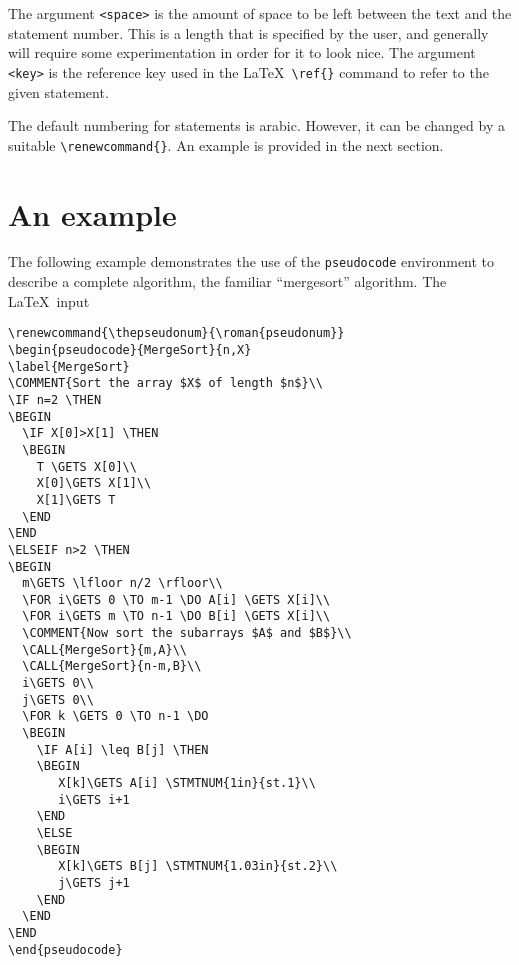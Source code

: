 \documentclass{article}
\newcommand{\keyword}[1]{\texttt{#1}}
\begin{document}
\noindent{}The argument \verb+<space>+ is the amount of space to be left between
the text and the statement number.  This is a length that is specified by the
user, and generally will require some experimentation in order for it to look nice.
The argument \verb+<key>+ is the reference key
used in the LaTeX\  \verb+\ref{}+ command to refer to the given
statement.

The default numbering for statements is arabic. However, it can be changed
by a suitable \verb+\renewcommand{}+.
An example is provided in the next section.

\section{An example}

The following example demonstrates the use of the
\keyword{pseudocode} environment to describe a complete
algorithm, the familiar ``mergesort'' algorithm. The \LaTeX\ input

\begin{verbatim}
\renewcommand{\thepseudonum}{\roman{pseudonum}}
\begin{pseudocode}{MergeSort}{n,X}
\label{MergeSort}
\COMMENT{Sort the array $X$ of length $n$}\\
\IF n=2 \THEN
\BEGIN
  \IF X[0]>X[1] \THEN
  \BEGIN
    T \GETS X[0]\\
    X[0]\GETS X[1]\\
    X[1]\GETS T
  \END
\END
\ELSEIF n>2 \THEN
\BEGIN
  m\GETS \lfloor n/2 \rfloor\\
  \FOR i\GETS 0 \TO m-1 \DO A[i] \GETS X[i]\\
  \FOR i\GETS m \TO n-1 \DO B[i] \GETS X[i]\\
  \COMMENT{Now sort the subarrays $A$ and $B$}\\
  \CALL{MergeSort}{m,A}\\
  \CALL{MergeSort}{n-m,B}\\
  i\GETS 0\\
  j\GETS 0\\
  \FOR k \GETS 0 \TO n-1 \DO
  \BEGIN
    \IF A[i] \leq B[j] \THEN
    \BEGIN
       X[k]\GETS A[i] \STMTNUM{1in}{st.1}\\
       i\GETS i+1
    \END
    \ELSE
    \BEGIN
       X[k]\GETS B[j] \STMTNUM{1.03in}{st.2}\\
       j\GETS j+1
    \END
  \END
\END
\end{pseudocode}
\end{verbatim}
\end{document}
